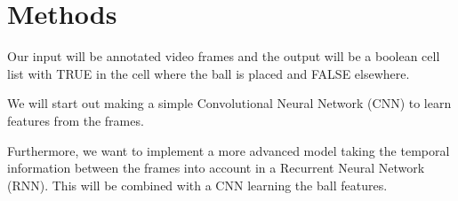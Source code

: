 
\section{Methods}
Our input will be annotated video frames and the output will be a boolean cell list with TRUE in the cell where the ball is placed and FALSE elsewhere.

We will start out making a simple Convolutional Neural Network (CNN) to learn features from the frames.

Furthermore, we want to implement a more advanced model taking the temporal information between the frames into account in a Recurrent Neural Network (RNN). This will be combined with a CNN learning the ball features.